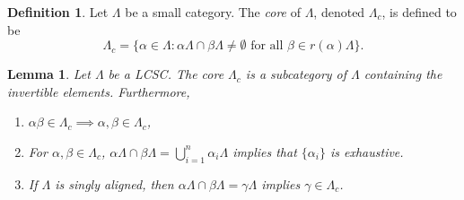 \documentclass[12pt]{amsart}
\newtheorem{lemma}[thm]{Lemma}
\theoremstyle{definition}
\newtheorem{definition}[thm]{Definition}
\theoremstyle{remark}
\numberwithin{equation}{section}
\renewcommand{\L}{\Lambda}
\renewcommand{\a}{\alpha}
\renewcommand{\b}{\beta}
\newcommand{\ga}{\gamma}
\begin{document}
\begin{definition}
	Let $\L$ be a small category. The {\em core} of $\L$, denoted $\L_c$, is defined to be
	\[
	\L_c = \{\a\in\L: \a\L\cap \b\L \neq \emptyset\text{ for all }\b\in r(\a)\L\}.
	\]
\end{definition}
\begin{lemma}\label{lem:core_properties}
	Let $\L$ be a LCSC. The core $\L_c$ is a subcategory of $\L$ containing the invertible elements. Furthermore, 
	\begin{enumerate}
		\item $\a\b\in \L_c \implies \a,\b\in \L_c$, 
		\item For $\a,\b\in \L_c$, $\a\L\cap \b\L = \bigcup_{i=1}^n\a_i\L$ implies that $\{\a_i\}$ is exhaustive.
		\item If $\L$ is singly aligned, then $\a\L\cap \b\L = \ga\L$ implies $\ga\in\L_c$. 
	\end{enumerate}
\end{lemma}
\end{document}
